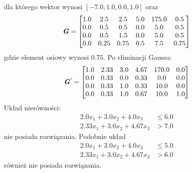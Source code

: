 dla którego wektor  wynosi $[-7.0,1.0,0.0,1.0]$ oraz
\begin{equation*}
  \textbf{\textit{G}} =
  \begin{bmatrix}
    1.0 & 2.5 & 2.5 & 5.0 & 175.0 & 0.5 \\
    0.0 & 0.5 & 0.5 & 0.0 & 5.0 & 0.5 \\
    0.0 & 0.5 & 1.5 & 0.0 & 5.0 & 0.5 \\
    0.0 & 0.25 & 0.75 & 0.5 & 7.5 & 0.75
  \end{bmatrix}
\end{equation*}
gdzie element osiowy wynosi $0.75$. Po eliminacji Gaussa:
\begin{equation*}
  \textbf{\textit{G\textsuperscript{'}}} =
  \begin{bmatrix}
    1.0 & 2.33 & 3.0 & 4.67 & 170.0 & 0.0 \\
    0.0 & 0.33 & 0.0 & 0.33 & 0.0 & 0.0 \\
    0.0 & 0.33 & 1.0 & 0.33 & 10.0 & 0.0 \\
    0.0 & 0.33 & 1.0 & 0.67 & 10.0 & 1.0
  \end{bmatrix}
\end{equation*}
Układ nierówności:
\begin{equation*}
  \begin{aligned}
    2.0 x_{1}+ 3.0 x_{2}+ 4.0 x_{3} &\le 6.0 \\
    2.33 x_{1}+ 3.0 x_{2}+ 4.67 x_{3} &> 7.0
  \end{aligned}
\end{equation*}
nie posiada rozwiązania. Podobnie układ
\begin{equation*}
  \begin{aligned}
    2.0 x_{1}+ 3.0 x_{2}+ 4.0 x_{3} &\le 5.0 \\
    2.33 x_{1}+ 3.0 x_{2}+ 4.67 x_{3} &> 6.0
  \end{aligned}
\end{equation*}
również nie posiada rozwiązania.

